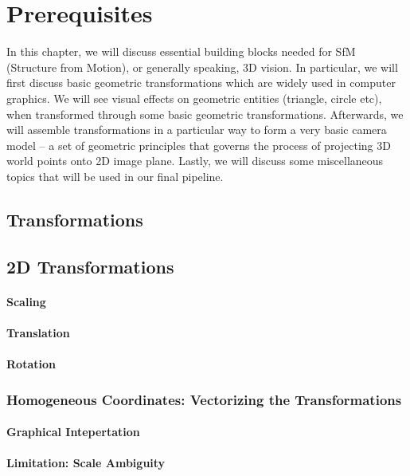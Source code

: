 \documentclass{book}
\begin{document}
    \chapter{Prerequisites}
        In this chapter, we will discuss essential building blocks needed for SfM (Structure from Motion), or generally speaking, 3D vision.
        In particular, we will first discuss basic geometric transformations which are widely used in computer graphics. We will see visual
        effects on geometric entities (triangle, circle etc), when transformed through some basic geometric transformations. Afterwards, we 
        will assemble transformations in a particular way to form a very basic camera model -- a set of geometric principles that governs the
        process of projecting 3D world points onto 2D image plane. Lastly, we will discuss some miscellaneous topics that will be used in 
        our final pipeline. 

        \section{Transformations}
            \section{2D Transformations}
                \subsubsection{Scaling}

                \subsubsection{Translation}

                \subsubsection{Rotation}

            \subsection{Homogeneous Coordinates: Vectorizing the Transformations}
                \subsubsection{Graphical Intepertation}

                \subsubsection{Limitation: Scale Ambiguity}
\end{document}

